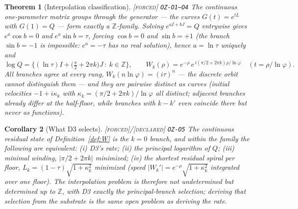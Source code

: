 \documentclass[11pt]{article}
\newcommand{\tagF}{\textcolor{cF}{\textsc{[forced]}}}
\newcommand{\tagD}{\textcolor{cD}{\textsc{[declared]}}}
\newcommand{\hx}[1]{\textcolor{cC}{\footnotesize\texttt{#1}}}
\newcommand{\Z}{\mathbb{Z}}
\newcommand{\gp}{\varphi}
\theoremstyle{plain}
\newtheorem{theorem}{Theorem}[section]
\newtheorem{corollary}[theorem]{Corollary}
\theoremstyle{definition}
\theoremstyle{remark}
\begin{document}
\begin{theorem}[Interpolation classification]\label{thm:interp}\tagF{} \hx{OZ-O1--O4}
The continuous one-parameter matrix groups through the generator --- the curves
$G(t)=e^{tL}$ with $G(1)=Q$ --- form exactly a $\Z$-family. Solving
$e^{aI+bJ}=Q$ entrywise gives $e^a\cos b=0$ and $e^a\sin b=\tau$, forcing
$\cos b=0$ and $\sin b=+1$ (the branch $\sin b=-1$ is impossible: $e^a=-\tau$
has no real solution), hence $a=\ln\tau$ uniquely and
\[
\log Q=\bigl\{(\ln\tau)I+\bigl(\tfrac\pi2+2\pi k\bigr)J\ :\ k\in\Z\bigr\},
\qquad
W_k(\rho)=e^{-\rho}\,e^{\,i(\pi/2+2\pi k)\rho/\ln\gp}
\quad(t=\rho/\ln\gp).
\]
All branches agree at \emph{every} rung, $W_k(n\ln\gp)=(i\tau)^n$ --- the
discrete orbit cannot distinguish them --- and they are pairwise distinct as
curves (initial velocities $-1+i\kappa_k$ with
$\kappa_k=(\pi/2+2\pi k)/\ln\gp$ all distinct; adjacent branches already
differ at the half-floor, while branches with $k-k'$ even coincide there but
never as functions).
\end{theorem}

\begin{corollary}[What D3 selects]\label{cor:d3select}\tagF{}/\tagD{} \hx{OZ-O5}
The continuous residual state of Definition~\ref{def:W} is the $k=0$ branch,
and within the family the following are equivalent: (i) D3's rate; (ii) the
\emph{principal} logarithm of $Q$; (iii) minimal winding,
$|\pi/2+2\pi k|$ minimized; (iv) the shortest residual spiral per floor,
$L_k=(1-\tau)\sqrt{1+\kappa_k^2}$ minimized (speed
$|W_k'|=e^{-\rho}\sqrt{1+\kappa_k^2}$ integrated over one floor). The
interpolation problem is therefore not undetermined but \emph{determined up to
$\Z$}, with D3 exactly the principal-branch selection; deriving that selection
from the substrate is the same open problem as deriving the rate.
\end{corollary}
\end{document}
